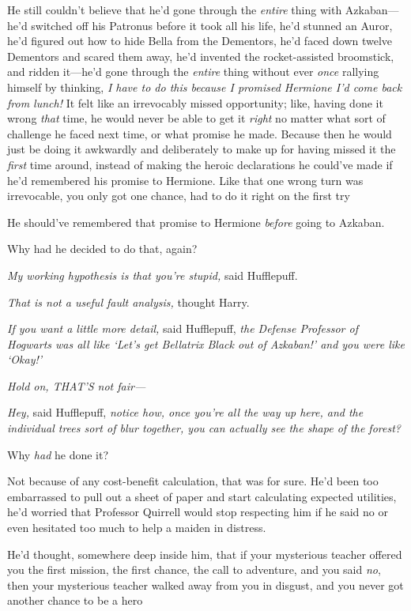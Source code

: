 He still couldn't believe that he'd gone through the \emph{entire} thing with
Azkaban---he'd switched off his Patronus before it took all his life, he'd
stunned an Auror, he'd figured out how to hide Bella from the Dementors, he'd
faced down twelve Dementors and scared them away, he'd invented the
rocket-assisted broomstick, and ridden it---he'd gone through the \emph{entire}
thing without ever \emph{once} rallying himself by thinking, \emph{I have to do
this{\el} because{\el} I promised Hermione I'd come back from lunch!} It
felt like an irrevocably missed opportunity; like, having done it wrong
\emph{that} time, he would never be able to get it \emph{right} no matter what
sort of challenge he faced next time, or what promise he made. Because then he
would just be doing it awkwardly and deliberately to make up for having missed
it the \emph{first} time around, instead of making the heroic declarations he
could've made if he'd remembered his promise to Hermione. Like that one wrong
turn was irrevocable, you only got one chance, had to do it right on the first
try{\el}

He should've remembered that promise to Hermione \emph{before} going to Azkaban.

Why had he decided to do that, again?

\emph{My working hypothesis is that you're stupid,} said Hufflepuff.

\emph{That is not a useful fault analysis,} thought Harry.

\emph{If you want a little more detail,} said Hufflepuff, \emph{the Defense
Professor of Hogwarts was all like `Let's get Bellatrix Black out of Azkaban!'
and you were like `Okay!'}

\emph{Hold on, THAT'S not fair---}

\emph{Hey,} said Hufflepuff, \emph{notice how, once you're all the way up here,
and the individual trees sort of blur together, you can actually see the shape
of the forest?}

Why \emph{had} he done it{\el}?

Not because of any cost-benefit calculation, that was for sure. He'd been too
embarrassed to pull out a sheet of paper and start calculating expected
utilities, he'd worried that Professor Quirrell would stop respecting him if he
said no or even hesitated too much to help a maiden in distress.

He'd thought, somewhere deep inside him, that if your mysterious teacher
offered you the first mission, the first chance, the call to adventure, and you
said \emph{no}, then your mysterious teacher walked away from you in disgust,
and you never got another chance to be a hero{\el}

